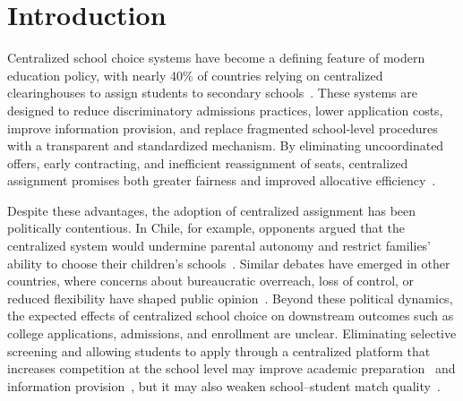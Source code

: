 \section{Introduction}

Centralized school choice systems have become a defining feature of modern education policy, with nearly 40\% of countries relying on centralized clearinghouses to assign students to secondary schools~\cite{ccas_2024}. These systems are designed to reduce discriminatory admissions practices, lower application costs, improve information provision, and replace fragmented school-level procedures with a transparent and standardized mechanism. By eliminating uncoordinated offers, early contracting, and inefficient reassignment of seats, centralized assignment promises both greater fairness and improved allocative efficiency~\citep{Roth1990}. 

Despite these advantages, the adoption of centralized assignment has been politically contentious. In Chile, for example, opponents argued that the centralized system would undermine parental autonomy and restrict families' ability to choose their children's schools~\citep{rebolledo2018}. Similar debates have emerged in other countries, where concerns about bureaucratic overreach, loss of control, or reduced flexibility have shaped public opinion~\citep{fox5ny_lottery_2022, sfstandard_lottery_2026, guardian_brighton_lottery_2017}. Beyond these political dynamics, the expected effects of centralized school choice on downstream outcomes such as college applications, admissions, and enrollment are unclear. Eliminating selective screening and allowing students to apply through a centralized platform that increases competition at the school level may improve academic preparation~\citep{camposkearns2024} and information provision~\citep{arteaga2022smart}, but it may also weaken school--student match quality~\citep{KaufmanRosenbaum1992, cullen2006, LightStrayer2000}. 


